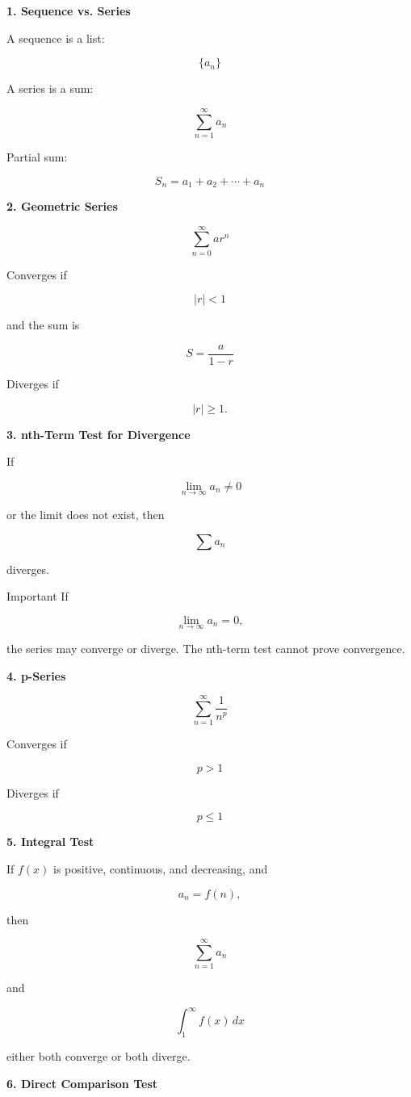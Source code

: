 \documentclass[11pt]{article}
\newcommand{\subtopic}[1]{
\vspace{0.45em}
\textcolor{novelPurpleDark}{\textbf{#1}}
}
\begin{document}
\subtopic{1. Sequence vs. Series}

A sequence is a list:

\[
\{a_n\}
\]

A series is a sum:

\[
\sum_{n=1}^{\infty}a_n
\]

Partial sum:

\[
S_n=a_1+a_2+\cdots+a_n
\]

\subtopic{2. Geometric Series}

\[
\sum_{n=0}^{\infty}ar^n
\]

Converges if

\[
|r|<1
\]

and the sum is

\[
S=\frac{a}{1-r}
\]

Diverges if

\[
|r|\ge1.
\]

\subtopic{3. nth-Term Test for Divergence}

If

\[
\lim_{n\to\infty}a_n\neq0
\]

or the limit does not exist, then

\[
\sum a_n
\]

diverges.

\begin{warningbox}{Important}
If

\[
\lim_{n\to\infty}a_n=0,
\]

the series may converge or diverge.  
The nth-term test cannot prove convergence.
\end{warningbox}

\subtopic{4. p-Series}

\[
\sum_{n=1}^{\infty}\frac1{n^p}
\]

Converges if

\[
p>1
\]

Diverges if

\[
p\le1
\]

\subtopic{5. Integral Test}

If \(f(x)\) is positive, continuous, and decreasing, and

\[
a_n=f(n),
\]

then

\[
\sum_{n=1}^{\infty}a_n
\]

and

\[
\int_1^\infty f(x)\,dx
\]

either both converge or both diverge.

\subtopic{6. Direct Comparison Test}
\end{document}
